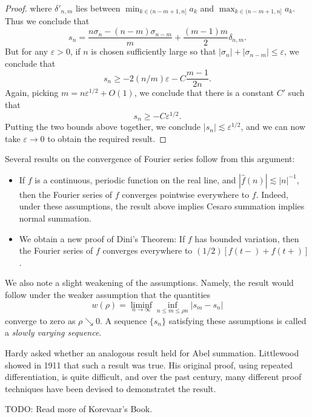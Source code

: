 \begin{proof}
    where $\delta'_{n,m}$ lies between $\min_{k \in (n-m+1,n]} a_k$ and $\max_{k \in (n-m+1,n]} a_k$. Thus we conclude that
    \[ s_n = \frac{n \sigma_n - (n-m) \sigma_{n-m}}{m} + \frac{(m-1)m}{2} \delta_{n,m}. \]
    But for any $\varepsilon > 0$, if $n$ is chosen sufficiently large so that $|\sigma_n| + |\sigma_{n-m}| \leq \varepsilon$, we conclude that
    \[ s_n \geq - 2(n/m) \varepsilon - C \frac{m-1}{2n}. \]
    Again, picking $m = n \varepsilon^{1/2} + O(1)$, we conclude that there is a constant $C'$ such that
    \[ s_n \geq -C \varepsilon^{1/2}. \]
    Putting the two bounds above together, we conclude $|s_n| \lesssim \varepsilon^{1/2}$, and we can now take $\varepsilon \to 0$ to obtain the required result.
\end{proof}

Several results on the convergence of Fourier series follow from this argument:
%
\begin{itemize}
    \item If $f$ is a continuous, periodic function on the real line, and $|\widehat{f}(n)| \lesssim |n|^{-1}$, then the Fourier series of $f$ converges pointwise everywhere to $f$. Indeed, under these assumptions, the result above implies Cesaro summation implies normal summation.

    \item We obtain a new proof of Dini's Theorem: If $f$ has bounded variation, then the Fourier series of $f$ converges everywhere to $(1/2) [f(t-) + f(t+)]$.
\end{itemize}
%
We also note a slight weakening of the assumptions. Namely, the result would follow under the weaker assumption that the quantities
%
\[ w( \rho ) = \liminf_{n \to \infty} \inf_{n \leq m \leq \rho n} |s_m - s_n| \]
%
converge to zero as $\rho \searrow 0$. A sequence $\{ s_n \}$ satisfying these assumptions is called a \emph{slowly varying sequence}.

Hardy asked whether an analogous result held for Abel summation. Littlewood showed in 1911 that such a result was true. His original proof, using repeated differentiation, is quite difficult, and over the past century, many different proof techniques have been devised to demonstratet the result.

TODO: Read more of Korevaar's Book.



















